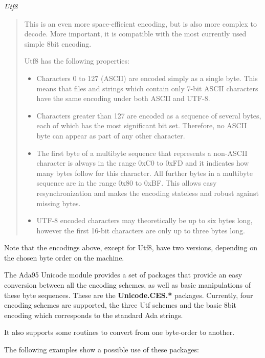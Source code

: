 \documentclass[letterpaper,10pt,english]{sphinxmanual}
\begin{document}
\emph{Utf8}
\begin{quote}

This is an even more space-efficient encoding, but is also more complex to
decode. More important, it is compatible with the most currently used simple
8bit encoding.

Utf8 has the following properties:
\begin{itemize}
\item {} 
Characters 0 to 127 (ASCII) are encoded simply as a single byte.
This means that files and strings which contain only 7-bit ASCII
characters have the same encoding under both ASCII and UTF-8.

\item {} 
Characters greater than 127 are encoded as a sequence of several
bytes, each of which has the most significant bit set. Therefore,
no ASCII byte can appear as part of any other character.

\item {} 
The first byte of a multibyte sequence that represents a non-ASCII
character is always in the range 0xC0 to 0xFD and it indicates how
many bytes follow for this character. All further bytes in a
multibyte sequence are in the range 0x80 to 0xBF. This allows easy
resynchronization and makes the encoding stateless and robust
against missing bytes.

\item {} 
UTF-8 encoded characters may theoretically be up to six bytes
long, however the first 16-bit characters are only up to three bytes
long.

\end{itemize}
\end{quote}

Note that the encodings above, except for Utf8, have two versions, depending on
the chosen byte order on the machine.

The Ada95 Unicode module provides a set of packages that provide an easy
conversion between all the encoding schemes, as well as basic manipulations of
these byte sequences. These are the \textbf{Unicode.CES.*} packages.  Currently,
four encoding schemes are supported, the three Utf schemes and the basic 8bit
encoding which corresponds to the standard Ada strings.

It also supports some routines to convert from one byte-order to another.

The following examples show a possible use of these packages:
\end{document}
